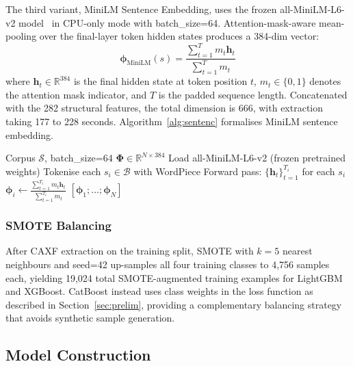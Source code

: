 \documentclass[11pt,a4paper]{article}
\begin{document}
The third variant, MiniLM Sentence Embedding, uses the frozen all-MiniLM-L6-v2 model~\cite{minilm2020} in CPU-only mode with batch\_size=64. Attention-mask-aware mean-pooling over the final-layer token hidden states produces a 384-dim vector:
\begin{equation}
  \boldsymbol{\phi}_{\text{MiniLM}}(s) = \frac{\sum_{t=1}^{T} m_t \mathbf{h}_t}{\sum_{t=1}^{T} m_t}
  \label{eq:minilm}
\end{equation}
where $\mathbf{h}_t \in \mathbb{R}^{384}$ is the final hidden state at token position $t$, $m_t \in \{0,1\}$ denotes the attention mask indicator, and $T$ is the padded sequence length. Concatenated with the 282 structural features, the total dimension is 666, with extraction taking 177 to 228 seconds. Algorithm~\ref{alg:sentenc} formalises MiniLM sentence embedding.

\begin{algorithm}[ht]
\caption{MiniLM Sentence Embedding}
\label{alg:sentenc}
\begin{algorithmic}[1]
\REQUIRE Corpus $\mathcal{S}$, batch\_size=64
\ENSURE $\boldsymbol{\Phi} \in \mathbb{R}^{N \times 384}$
\STATE Load all-MiniLM-L6-v2 (frozen pretrained weights)
  \STATE Tokenise each $s_i \in \mathcal{B}$ with WordPiece
  \STATE Forward pass: $\{\mathbf{h}_t\}_{t=1}^{T_i}$ for each $s_i$
  \STATE $\boldsymbol{\phi}_i \leftarrow \frac{\sum_{t=1}^{T_i} m_t \mathbf{h}_t}{\sum_{t=1}^{T_i} m_t}$
\ENDFOR
\RETURN $[\boldsymbol{\phi}_1; \ldots; \boldsymbol{\phi}_N]$
\end{algorithmic}
\end{algorithm}

\subsubsection{SMOTE Balancing}

After CAXF extraction on the training split, SMOTE with $k=5$ nearest neighbours and seed=42 up-samples all four training classes to 4,756 samples each, yielding 19,024 total SMOTE-augmented training examples for LightGBM and XGBoost. CatBoost instead uses class weights in the loss function as described in Section~\ref{sec:prelim}, providing a complementary balancing strategy that avoids synthetic sample generation.

\subsection{Model Construction}
\label{ssec:model}
\end{document}
